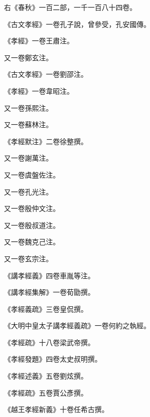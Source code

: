 \begin{pinyinscope}
 右《春秋》一百二部，一千一百八十四卷。



 《古文孝經》一卷孔子說，曾參受，孔安國傳。



 《孝經》一卷王肅注。



 又一卷鄭玄注。



 《古文孝經》一卷劉邵注。



 《孝經》一卷韋昭注。



 又一卷孫熙注。



 又一卷蘇林注。



 《孝經默注》二卷徐整撰。



 又一卷謝萬注。



 又一卷虞盤佐注。



 又一卷孔光注。



 又一卷殷仲文注。



 又一卷殷叔道注。



 又一卷魏克己注。



 又一卷玄宗注。



 《講孝經義》四卷車胤等注。



 《講孝經集解》一卷荀勖撰。



 《孝經義疏》三卷皇侃撰。



 《大明中皇太子講孝經義疏》一卷何約之執經。



 《孝經疏》十八卷梁武帝撰。



 《孝經發題》四卷太史叔明撰。



 《孝經述義》五卷劉炫撰。



 《孝經疏》五卷賈公彥撰。



 《越王孝經新義》十卷任希古撰。




\end{pinyinscope}

